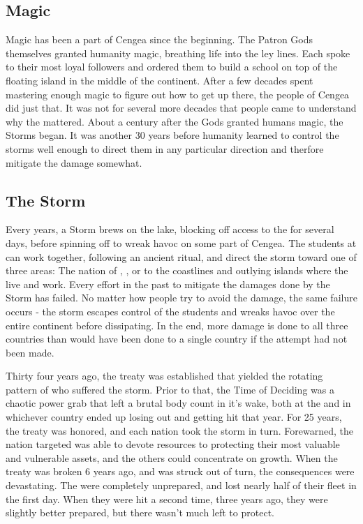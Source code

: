 \documentclass[blue]{GL2020}
\begin{document}
\subsection*{Magic}
Magic has been a part of Cengea since the beginning. The Patron Gods themselves granted humanity magic, breathing life into the ley lines. Each spoke to their most loyal followers and ordered them to build a school on top of the floating island in the middle of the continent. After a few decades spent mastering enough magic to figure out how to get up there, the people of Cengea did just that. It was not for several more decades that people came to understand why the \pSc{} mattered. About a century after the Gods granted humans magic, the Storms began. It was another 30 years before humanity learned to control the storms well enough to direct them in any particular direction and therfore mitigate the damage somewhat.

\subsection*{The Storm}
Every \pCycle{} years, a Storm brews on the lake, blocking off access to the \pSc{} for several days, before spinning off to wreak havoc on some part of Cengea. The students at \pSchool{} can work together, following an ancient ritual, and direct the storm toward one of three areas: The nation of \pFarm{}, \pTech{}, or to the coastlines and outlying islands where the \pShippies{} live and work. Every effort in the past to mitigate the damages done by the Storm has failed. No matter how people try to avoid the damage, the same failure occurs - the storm escapes control of the students and wreaks havoc over the entire continent before dissipating. In the end, more damage is done to all three countries than would have been done to a single country if the attempt had not been made. 

Thirty four years ago, the treaty was established that yielded the rotating pattern of who suffered the storm. Prior to that, the Time of Deciding was a chaotic power grab that left a brutal body count in it's wake, both at the \pSchool{} and in whichever country ended up losing out and getting hit that year. For 25 years, the treaty was honored, and each nation took the storm in turn. Forewarned, the nation targeted was able to devote resources to protecting their most valuable and vulnerable assets, and the others could concentrate on growth. When the treaty was broken 6 years ago, and \pShip{} was struck out of turn, the consequences were devastating. The \pShippies{} were completely unprepared, and lost nearly half of their fleet in the first day. When they were hit a second time, three years ago, they were slightly better prepared, but there wasn't much left to protect.
\end{document}
